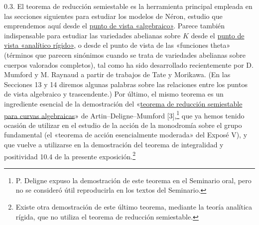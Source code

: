 0.3. El teorema de reducción semiestable es la herramienta principal
empleada en las secciones siguientes para estudiar los modelos de
Néron, estudio que emprendemos aquí desde el \underline{punto de vista
«algebraico»}. Parece también indispensable para estudiar las
variedades abelianas sobre $K$ desde el \underline{punto de vista
«analítico rígido»}, o desde el punto de vista de las «funciones theta»
(términos que parecen sinónimos cuando se trata de variedades abelianas
sobre cuerpos valorados completos), tal como ha sido desarrollado
recientemente por D. Mumford y M. Raynaud a partir de trabajos de Tate
y Morikawa. (En las Secciones 13 y 14 diremos algunas palabras sobre
las relaciones entre los puntos de vista algebraico y trascendente.)
Por último, el mismo teorema es un ingrediente esencial de la
demostración del «\underline{teorema de reducción semiestable para
curvas algebraicas}» de Artin--Deligne--Mumford [3],\footnote{P.
Deligne expuso la demostración de este teorema en el Seminario oral,
pero no se consideró útil reproducirla en los textos del Seminario.}
que ya hemos tenido ocasión de utilizar en el estudio de la acción de
la monodromía sobre el grupo fundamental (el «teorema de acción
esencialmente moderada» del Exposé V), y que vuelve a utilizarse en la
demostración del teorema de integralidad y positividad 10.4 de la
presente exposición.\footnote{Existe otra demostración de este último
teorema, mediante la teoría analítica rígida, que no utiliza el teorema
de reducción semiestable.}


